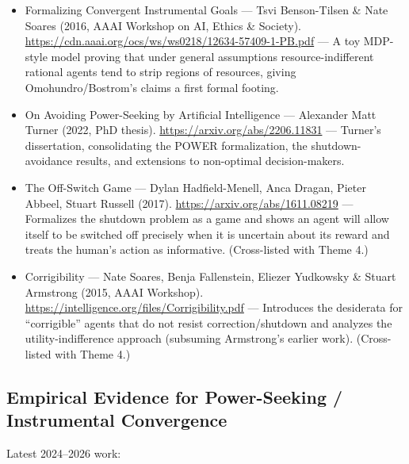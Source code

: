 \documentclass[11pt]{article}
\begin{document}
\begin{itemize}
  \item Formalizing Convergent Instrumental Goals --- Tsvi Benson-Tilsen \& Nate Soares (2016, AAAI Workshop on AI, Ethics \& Society). \url{https://cdn.aaai.org/ocs/ws/ws0218/12634-57409-1-PB.pdf} --- A toy MDP-style model proving that under general assumptions resource-indifferent rational agents tend to strip regions of resources, giving Omohundro/Bostrom's claims a first formal footing.
  \item On Avoiding Power-Seeking by Artificial Intelligence --- Alexander Matt Turner (2022, PhD thesis). \url{https://arxiv.org/abs/2206.11831} --- Turner's dissertation, consolidating the POWER formalization, the shutdown-avoidance results, and extensions to non-optimal decision-makers.
  \item The Off-Switch Game --- Dylan Hadfield-Menell, Anca Dragan, Pieter Abbeel, Stuart Russell (2017). \url{https://arxiv.org/abs/1611.08219} --- Formalizes the shutdown problem as a game and shows an agent will allow itself to be switched off precisely when it is uncertain about its reward and treats the human's action as informative. (Cross-listed with Theme 4.)
  \item Corrigibility --- Nate Soares, Benja Fallenstein, Eliezer Yudkowsky \& Stuart Armstrong (2015, AAAI Workshop). \url{https://intelligence.org/files/Corrigibility.pdf} --- Introduces the desiderata for ``corrigible'' agents that do not resist correction/shutdown and analyzes the utility-indifference approach (subsuming Armstrong's earlier work). (Cross-listed with Theme 4.)
\end{itemize}

\subsection*{Empirical Evidence for Power-Seeking / Instrumental Convergence}

Latest 2024--2026 work:
\end{document}
